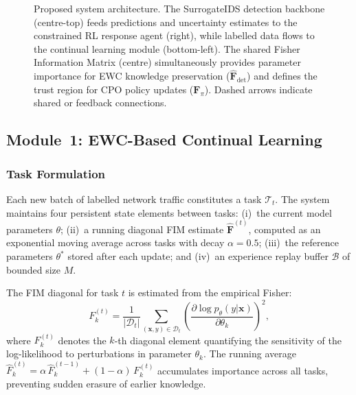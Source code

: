 \documentclass[journal]{IEEEtran}
\theoremstyle{definition}
\theoremstyle{remark}
\newcommand{\FIM}{\mathbf{F}}
\begin{document}
\begin{figure}[!t]
\caption{Proposed system architecture. The SurrogateIDS detection backbone (centre-top) feeds predictions and uncertainty estimates to the constrained RL response agent (right), while labelled data flows to the continual learning module (bottom-left). The shared Fisher Information Matrix (centre) simultaneously provides parameter importance for EWC knowledge preservation ($\hat{\mathbf{F}}_{\mathrm{det}}$) and defines the trust region for CPO policy updates ($\mathbf{F}_\pi$). Dashed arrows indicate shared or feedback connections.}
\label{fig:architecture}
\end{figure}

\subsection{Module~1: EWC-Based Continual Learning}
\label{subsec:cl_method}

\subsubsection{Task Formulation}
\label{subsubsec:task}
Each new batch of labelled network traffic constitutes a task $\mathcal{T}_t$. The system maintains four persistent state elements between tasks: (i)~the current model parameters $\theta$; (ii)~a running diagonal FIM estimate $\hat{\FIM}^{(t)}$, computed as an exponential moving average across tasks with decay $\alpha = 0.5$; (iii)~the reference parameters $\theta^*$ stored after each update; and (iv)~an experience replay buffer $\mathcal{B}$ of bounded size $M$.

The FIM diagonal for task $t$ is estimated from the empirical Fisher:
\begin{equation}
\label{eq:fisher_diag}
F_k^{(t)} = \frac{1}{|\mathcal{D}_t|}\sum_{(\mathbf{x},y)\in\mathcal{D}_t}\left(\frac{\partial \log p_\theta(y|\mathbf{x})}{\partial \theta_k}\right)^{\!2},
\end{equation}
where $F_k^{(t)}$ denotes the $k$-th diagonal element quantifying the sensitivity of the log-likelihood to perturbations in parameter $\theta_k$. The running average $\hat{F}_k^{(t)} = \alpha\,\hat{F}_k^{(t-1)} + (1-\alpha)\,F_k^{(t)}$ accumulates importance across all tasks, preventing sudden erasure of earlier knowledge.
\end{document}
